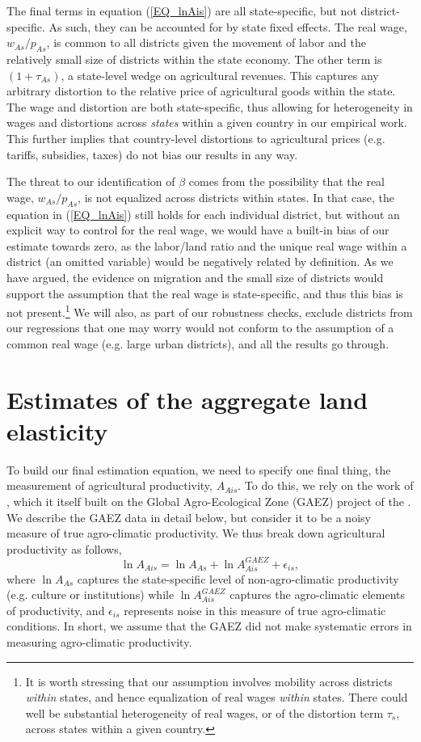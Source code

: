 \documentclass[11pt]{article}
\begin{document}
The final terms in equation (\ref{EQ_lnAis}) are all state-specific, but not district-specific. As such, they can be accounted for by state fixed effects. The real wage, $w_{As}/p_{As}$, is common to all districts given the movement of labor and the relatively small size of districts within the state economy. The other term is $(1+\tau_{As})$, a state-level wedge on agricultural revenues. This captures any arbitrary distortion to the relative price of agricultural goods within the state. The wage and distortion are both state-specific, thus allowing for heterogeneity in wages and distortions across \textit{states} within a given country in our empirical work. This further implies that country-level distortions to agricultural prices (e.g. tariffs, subsidies, taxes) do not bias our results in any way.

The threat to our identification of $\beta$ comes from the possibility that the real wage, $w_{As}/p_{As}$, is not equalized across districts within states. In that case, the equation in (\ref{EQ_lnAis}) still holds for each individual district, but without an explicit way to control for the real wage, we would have a built-in bias of our estimate towards zero, as the labor/land ratio and the unique real wage within a district (an omitted variable) would be negatively related by definition. As we have argued, the evidence on migration and the small size of districts would support the assumption that the real wage is state-specific, and thus this bias is not present.\footnote{It is worth stressing that our assumption involves mobility across districts \textit{within} states, and hence equalization of real wages \textit{within} states. There could well be substantial heterogeneity of real wages, or of the distortion term $\tau_s$, across states within a given country.} We will also, as part of our robustness checks, exclude districts from our regressions that one may worry would not conform to the assumption of a common real wage (e.g. large urban districts), and all the results go through.

\section{Estimates of the aggregate land elasticity}
To build our final estimation equation, we need to specify one final thing, the measurement of agricultural productivity, $A_{Ais}$. To do this, we rely on the work of \cite{galorozak2016}, which it itself built on the Global Agro-Ecological Zone (GAEZ) project of the \cite{gaez}. We describe the GAEZ data in detail below, but consider it to be a noisy measure of true agro-climatic productivity. We thus break down agricultural productivity as follows,
\begin{equation*}
	\ln A_{Ais} = \ln A_{As} + \ln A^{GAEZ}_{Ais} + \epsilon_{is},
\end{equation*}
where $\ln A_{As}$ captures the state-specific level of non-agro-climatic productivity (e.g. culture or institutions) while $\ln A^{GAEZ}_{Ais}$ captures the agro-climatic elements of productivity, and $\epsilon_{is}$ represents noise in this measure of true agro-climatic conditions. In short, we assume that the GAEZ did not make systematic errors in measuring agro-climatic productivity.
\end{document}
